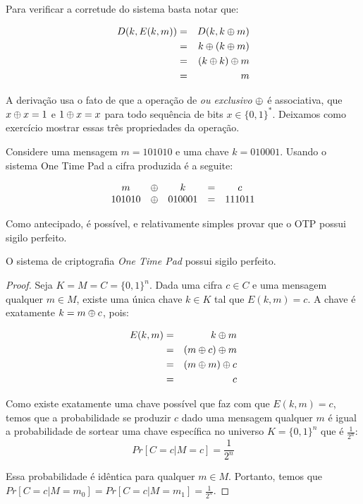 Para verificar a corretude do sistema basta notar que:

\begin{eqnarray*}
  D(k, E(k, m)) & = & D(k, k \oplus m)\\
                & = & k \oplus (k \oplus m)\\
                & = & (k \oplus k) \oplus m\\
                & = & m
\end{eqnarray*}

A derivação usa o fato de que a operação de {\em ou exclusivo} $\oplus$ é associativa, que $x \oplus x = 1$ e $1 \oplus x = x$ para todo sequência de bits $x \in \{0,1\}^*$.
Deixamos como exercício mostrar essas três propriedades da operação.

\begin{example}
  Considere uma mensagem $m = 101010$ e uma chave $k = 010001$.
Usando o sistema One Time Pad a cifra produzida é a seguite:

\begin{displaymath}
  \begin{array}{ccccc}
    m & \oplus & k & = & c \\
    101010 & \oplus & 010001 & = & 111011
  \end{array}
\end{displaymath}
\end{example}

Como antecipado, é possível, e relativamente simples provar que o OTP possui sigilo perfeito.

\begin{theorem}
  O sistema de criptografia {\em One Time Pad} possui sigilo perfeito.
\end{theorem}

\begin{proof}
  Seja $K = M = C = \{0,1\}^n$.
  Dada uma cifra $c \in C$ e uma mensagem qualquer $m \in M$, existe uma única chave $k \in K$ tal que $E(k,m) = c$.
  A chave é exatamente $k = m \oplus c$, pois:
  
  \begin{eqnarray*}
    E(k, m) & = & k \oplus m \\
            & = & (m \oplus c) \oplus m\\
            & = & (m \oplus m) \oplus c\\
            & = & c
  \end{eqnarray*}

Como existe exatamente uma chave possível que faz com que $E(k,m) = c$, temos que a probabilidade se produzir $c$ dado uma mensagem qualquer $m$ é igual a probabilidade de sortear uma chave específica no universo $K = \{0,1\}^n$ que é $\frac{1}{2^n}$:
\begin{displaymath}
  Pr[C = c | M = c] = \frac{1}{2^n}
\end{displaymath}

Essa probabilidade é idêntica para qualquer $m \in M$.
Portanto, temos que $Pr[C = c| M = m_0] = Pr[C = c | M = m_1] = \frac{1}{2^n}$. 
\end{proof}

